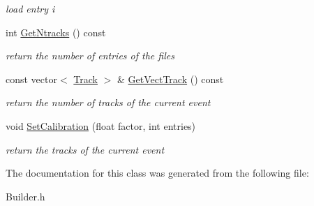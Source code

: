\begin{DoxyCompactItemize}
\begin{DoxyCompactList}\small\item\em load entry i \end{DoxyCompactList}\item 
\mbox{\label{class_builder_a86945b8b6a73f05283ca8a1ed9b7f57d}} 
int \mbox{\hyperlink{class_builder_a86945b8b6a73f05283ca8a1ed9b7f57d}{Get\+Ntracks}} () const
\begin{DoxyCompactList}\small\item\em return the number of entries of the files \end{DoxyCompactList}\item 
\mbox{\label{class_builder_a68164ea068d2a9ca29906e37ecf90f78}} 
const vector$<$ \mbox{\hyperlink{class_track}{Track}} $>$ \& \mbox{\hyperlink{class_builder_a68164ea068d2a9ca29906e37ecf90f78}{Get\+Vect\+Track}} () const
\begin{DoxyCompactList}\small\item\em return the number of tracks of the current event \end{DoxyCompactList}\item 
\mbox{\label{class_builder_a4c8e1be20e522cd38ff5e5fec15851c0}} 
void \mbox{\hyperlink{class_builder_a4c8e1be20e522cd38ff5e5fec15851c0}{Set\+Calibration}} (float factor, int entries)
\begin{DoxyCompactList}\small\item\em return the tracks of the current event \end{DoxyCompactList}\end{DoxyCompactItemize}


The documentation for this class was generated from the following file\+:\begin{DoxyCompactItemize}
\item 
Builder.\+h\end{DoxyCompactItemize}
